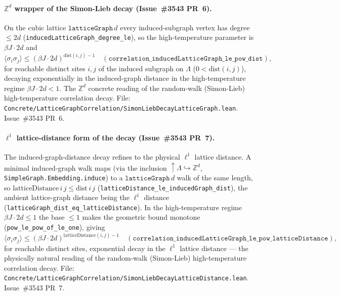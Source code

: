 \documentclass[a4paper,11pt]{article}
\begin{document}
\paragraph{$\mathbb Z^d$ wrapper of the Simon-Lieb decay (Issue~\#3543 PR~6).}
On the cubic lattice $\texttt{latticeGraph}\,d$ every induced-subgraph vertex has
degree $\le 2d$ (\texttt{inducedLatticeGraph\_degree\_le}), so the
high-temperature parameter is $\beta J \cdot 2d$ and
\[
  \langle\sigma_i\sigma_j\rangle
    \le (\beta J \cdot 2d)^{\mathrm{dist}(i,j)-1}
  \quad (\texttt{correlation\_inducedLatticeGraph\_le\_pow\_dist}),
\]
for reachable distinct sites $i,j$ of the induced subgraph on $\Lambda$
($0 < \mathrm{dist}(i,j)$), decaying exponentially in the induced-graph distance
in the high-temperature regime $\beta J \cdot 2d < 1$. The $\mathbb Z^d$ concrete
reading of the random-walk (Simon-Lieb) high-temperature correlation decay.
File: \texttt{Concrete/LatticeGraphCorrelation/SimonLiebDecayLatticeGraph.lean}.
Issue~\#3543 PR~6.

\paragraph{$\ell^1$ lattice-distance form of the decay (Issue~\#3543 PR~7).}
The induced-graph-distance decay refines to the physical $\ell^1$ lattice
distance. A minimal induced-graph walk maps (via the inclusion
$\uparrow\!\Lambda \hookrightarrow \mathbb Z^d$,
\texttt{SimpleGraph.Embedding.induce}) to a $\texttt{latticeGraph}\,d$ walk of the
same length, so $\mathrm{latticeDistance}\,i\,j \le \mathrm{dist}\,i\,j$
(\texttt{latticeDistance\_le\_inducedGraph\_dist}), the ambient lattice-graph
distance being the $\ell^1$ distance (\texttt{latticeGraph\_dist\_eq\_latticeDistance}).
In the high-temperature regime $\beta J \cdot 2d \le 1$ the base $\le 1$ makes the
geometric bound monotone (\texttt{pow\_le\_pow\_of\_le\_one}), giving
\[
  \langle\sigma_i\sigma_j\rangle
    \le (\beta J \cdot 2d)^{\mathrm{latticeDistance}(i,j)-1}
  \quad (\texttt{correlation\_inducedLatticeGraph\_le\_pow\_latticeDistance}),
\]
for reachable distinct sites, exponential decay in the $\ell^1$ lattice distance
--- the physically natural reading of the random-walk (Simon-Lieb) high-temperature
correlation decay. File:
\texttt{Concrete/LatticeGraphCorrelation/SimonLiebDecayLatticeDistance.lean}.
Issue~\#3543 PR~7.
\end{document}
